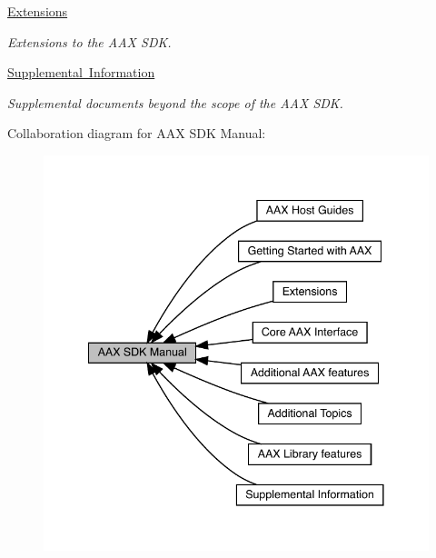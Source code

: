 \begin{DoxyCompactItemize}
\mbox{\hyperlink{a00837}{Extensions}}
\begin{DoxyCompactList}\small\item\em Extensions to the A\+AX S\+DK. \end{DoxyCompactList}\item 
\mbox{\hyperlink{a00841}{Supplemental Information}}
\begin{DoxyCompactList}\small\item\em Supplemental documents beyond the scope of the A\+AX S\+DK. \end{DoxyCompactList}\end{DoxyCompactItemize}
Collaboration diagram for A\+AX S\+DK Manual\+:
\nopagebreak
\begin{figure}[H]
\begin{center}
\leavevmode
\includegraphics[width=341pt]{a00793}
\end{center}
\end{figure}
